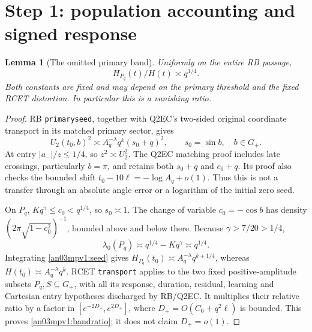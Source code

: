 \documentclass[11pt]{article}
\numberwithin{equation}{section}
\newtheorem{lemma}[theorem]{Lemma}\newtheorem{proposition}[theorem]{Proposition}
\theoremstyle{remark}\newtheorem{remark}[theorem]{Remark}
\newcommand{\Gp}{{G_+}}\newcommand{\Clk}{\mathcal C_q}
\begin{document}
\section{Step 1: population accounting and signed response}
\begin{lemma}[The omitted primary band]
\label{an03mpv1:band}
Uniformly on the entire RB passage,
\begin{equation}
 H_{P_q}(t)/H(t)\asymp q^{1/4}.
 \label{an03mpv1:bandratio}
\end{equation}
Both constants are fixed and may depend on the primary threshold and
the fixed RCET distortion. In particular this is a vanishing ratio.
\end{lemma}
\begin{proof}
RB \texttt{primaryseed}, together with Q2EC's two-sided original
coordinate transport in its matched primary sector, gives
\begin{equation}
 U_2(t_0,b)^2\asymp A_q^{-\lambda}q^k(s_0+q)^2,
 \qquad s_0=\sin b,\quad b\in\Gp.
 \label{an03mpv1:seed}
\end{equation}
At entry $|a_-|/z\le1/4$, so $z^2\asymp U_2^2$.
The Q2EC matching proof includes late crossings, particularly $b=\pi$,
and retains both $s_0+q$ and $c_0+q$. Its proof also checks the bounded
shift $t_0-10\ell=-\log A_q+o(1)$. Thus this is not a transfer
through an absolute angle error or a logarithm of the initial zero seed.

On $P_q$, $Kq^\gamma\le c_0<q^{1/4}$, so $s_0\asymp1$.
The change of variable $c_0=-\cos b$ has density
$(2\pi\sqrt{1-c_0^2})^{-1}$, bounded above and below there.
Because $\gamma>7/20>1/4$,
\[
 \lambda_0(P_q)\asymp q^{1/4}-Kq^\gamma\asymp q^{1/4}.
\]
Integrating \eqref{an03mpv1:seed} gives
$H_{P_q}(t_0)\asymp A_q^{-\lambda}q^{k+1/4}$, whereas
$H(t_0)\asymp A_q^{-\lambda}q^k$.
RCET \texttt{transport} applies to the two fixed positive-amplitude
subsets $P_q,S\subseteq\Gp$, with all its response, duration, residual,
learning and Cartesian entry hypotheses discharged by RB/Q2EC.
It multiplies their relative ratio by a factor in $[e^{-2D_+},e^{2D_+}]$,
where $D_+=O(C_0+q^2\ell)$ is bounded. This proves
\eqref{an03mpv1:bandratio}; it does not claim $D_+=o(1)$.
\end{proof}
\end{document}
